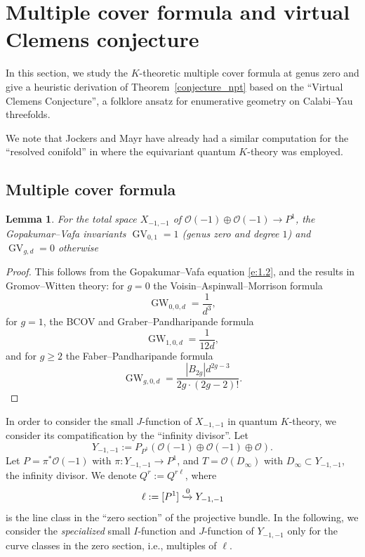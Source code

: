 \documentclass[11pt]{amsart}
\newtheorem{lemma}[theorem]{Lemma}
\newtheorem*{main theorem*}{Main Theorem}
\theoremstyle{remark}
\numberwithin{equation}{section}
\newcommand{\op}{\operatorname}
\def\O{\mathcal{O}}
\begin{document}
\section{Multiple cover formula and virtual Clemens conjecture}
In this section, we study the $K$-theoretic multiple cover formula at genus zero and give a heuristic derivation of 
Theorem~\ref{conjecture_npt} based on the ``Virtual Clemens Conjecture'', a folklore ansatz for enumerative geometry on Calabi--Yau threefolds. 

We note that Jockers and Mayr have already had a similar computation for the ``resolved conifold'' in \cite[\S~2.3]{Jockers_Mayr_2019} where the equivariant quantum $K$-theory was employed.

\subsection{Multiple cover formula}
\begin{lemma} \label{l:4.4}
For the total space $X_{-1,-1}$ of $\O(-1) \oplus \O (-1) \to P^1$, the Gopakumar--Vafa invariants $\op{GV}_{0,1} =1$ (genus zero and degree $1$) and $\op{GV}_{g,d} =0$ otherwise
\end{lemma}

\begin{proof}
This follows from the Gopakumar--Vafa equation \eqref{e:1.2}, and the results in Gromov--Witten theory: for $g=0$ the Voisin--Aspinwall--Morrison formula \cite{Voisin_1996}\cite{Aspinwall_Morrison_1993}
\[
 \op{GW}_{0,0,d} = \frac{1}{d^3},
\]
for $g=1$, the BCOV and Graber--Pandharipande formula \cite{Graber_Pandharipande_1997}
\[
 \op{GW}_{1,0,d} = \frac{1}{12 d},
\]
and for $g \geq 2$ the Faber--Pandharipande formula \cite{Faber_Pandharipande_1998}
\[
 \op{GW}_{g,0,d} = \frac{|B_{2g}| d^{2g-3}}{2g \cdot (2g-2)!}.
\]
\end{proof}

In order to consider the small $J$-function of $X_{-1,-1}$ in quantum $K$-theory, we consider its compatification by the ``infinity divisor''. Let 
\[
 Y_{-1,-1} := P_{P^1}(\mathcal{O}(-1)\oplus \mathcal{O}(-1)\oplus \mathcal{O} ).
 \]
Let $P = \pi^*\mathcal{O}(-1)$ with $\pi: Y_{-1,-1} \rightarrow P^1$, and $T = \mathcal{O}(D_{\infty})$ with $D_{\infty}\subset Y_{-1,-1}$, the infinity divisor. We denote $Q^r := Q^{r\ell}$, where 
\[
 \ell := [P^1] \xhookrightarrow{0} Y_{-1,-1}
\] 
is the line class in the ``zero section'' of the projective bundle. In the following, we consider the \emph{specialized} small $I$-function and $J$-function of $Y_{-1,-1}$ only for the curve classes in the zero section, i.e., multiples of $\ell$.
\end{document}
